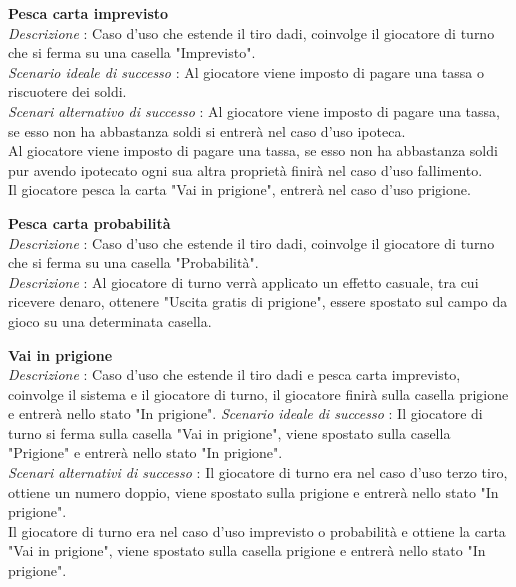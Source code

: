 \documentclass[a4paper]{article}
\begin{document}
\textbf{Pesca carta imprevisto}\\
\textit{Descrizione} : Caso d'uso che estende il tiro dadi, coinvolge il giocatore di turno che si ferma su una casella  "Imprevisto".\\
\textit{Scenario ideale di successo} : Al giocatore viene imposto di pagare una tassa o riscuotere dei soldi.\\
\textit{Scenari alternativo di successo} : Al giocatore viene imposto di pagare una tassa, se esso non ha abbastanza soldi si entrerà nel caso d'uso ipoteca.\\
Al giocatore viene imposto di pagare una tassa, se esso non ha abbastanza soldi pur avendo ipotecato ogni sua altra proprietà finirà nel caso d'uso fallimento.\\
Il giocatore pesca la carta "Vai in prigione", entrerà nel caso d'uso prigione.

\textbf{Pesca carta probabilità}\\
\textit{Descrizione} : Caso d'uso che estende il tiro dadi, coinvolge il giocatore di turno che si ferma su una casella "Probabilità".\\
\textit{Descrizione} : Al giocatore di turno verrà applicato un effetto casuale, tra cui ricevere denaro, ottenere "Uscita gratis di prigione", essere spostato sul campo da gioco su una determinata casella.

\textbf{Vai in prigione}\\
\textit{Descrizione} : Caso d'uso che estende il tiro dadi e pesca carta imprevisto, coinvolge il sistema e il giocatore di turno, il giocatore finirà sulla casella prigione e entrerà nello stato "In prigione".
\textit{Scenario ideale di successo} : Il giocatore di turno si ferma sulla casella "Vai in prigione", viene spostato sulla casella "Prigione" e entrerà nello stato "In prigione".\\
\textit{Scenari alternativi di successo} : Il giocatore di turno era nel caso d'uso terzo tiro, ottiene un numero doppio, viene spostato sulla prigione e entrerà nello stato "In prigione".\\
Il giocatore di turno era nel caso d'uso imprevisto o probabilità e ottiene la carta "Vai in prigione", viene spostato sulla casella prigione e entrerà nello stato "In prigione".
\end{document}
